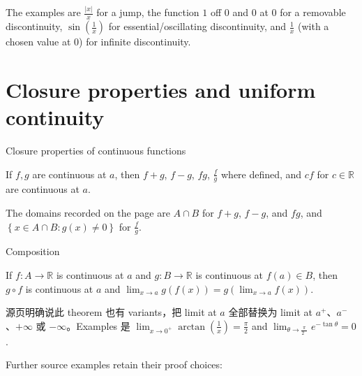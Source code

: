 The examples are \(\frac{|x|}{x}\) for a jump, the function \(1\) off \(0\) and \(0\) at \(0\) for a removable discontinuity, \(\sin\left( \frac{1}{x} \right)\) for essential/oscillating discontinuity, and \(\frac{1}{x}\) (with a chosen value at \(0\)) for infinite discontinuity.

\section{Closure properties and uniform continuity}

\begin{theorem}{Closure properties of continuous functions}

If \(f,g\) are continuous at \(a\), then \(f + g\), \(f - g\), \(fg\), \(\frac{f}{g}\) where defined, and \(cf\) for \(c \in \mathbb{R}\) are continuous at \(a\).

\end{theorem}

The domains recorded on the page are \(A \cap B\) for \(f + g\), \(f - g\), and \(fg\), and \(\left\{ {x \in A \cap B:g(x) \neq 0} \right\}\) for \(\frac{f}{g}\).

\begin{theorem}{Composition}

If \(f:A\rightarrow\mathbb{R}\) is continuous at \(a\) and \(g:B\rightarrow\mathbb{R}\) is continuous at \(f(a) \in B\), then \(g \circ f\) is continuous at \(a\) and \(\lim_{x\rightarrow a}g\left( {f(x)} \right) = g\left( {\lim_{x\rightarrow a}f(x)} \right)\).

\end{theorem}

源页明确说此 theorem 也有 variants，把 limit at \(a\) 全部替换为 limit at \(a^{+}\)、\(a^{-}\)、\(+ \infty\) 或 \(- \infty\)。Examples 是 \(\lim_{x\rightarrow 0^{+}}\arctan\left( \frac{1}{x} \right) = \frac{\pi}{2}\) and \(\lim_{\theta\rightarrow\frac{\pi}{2^{-}}}e^{- \tan\theta} = 0\).

Further source examples retain their proof choices:

